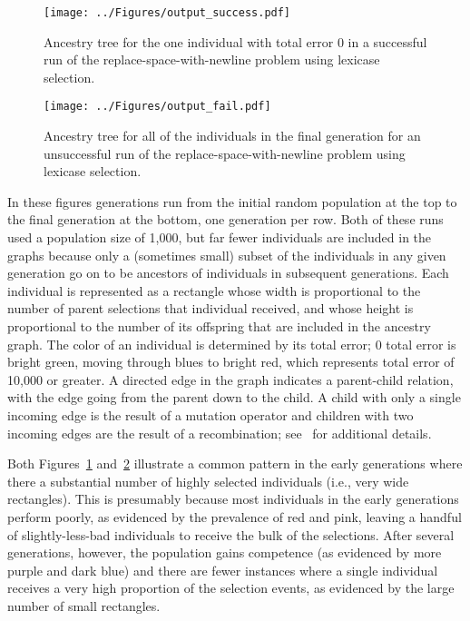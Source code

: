 \documentclass{sig-alternate}
\begin{document}
\begin{figure}[t]
	\centering
	\texttt{[image: ../Figures/output\_success.pdf]}
	\caption{Ancestry tree for the one individual with total error 0 in a successful run of the replace-space-with-newline problem using lexicase selection.}
	\label{fig:success}
\end{figure}

\begin{figure}[p]
	\centering
	\texttt{[image: ../Figures/output\_fail.pdf]}
	\caption{Ancestry tree for all of the individuals in the final generation for an unsuccessful run of the replace-space-with-newline problem using lexicase selection.}
	\label{fig:fail}
\end{figure}

In these figures generations run from the initial random population at the top to the final generation at the bottom, one generation per row.  Both of these runs used a population size of 1,000, but far fewer individuals are included in the graphs because only a (sometimes small) subset of the individuals in any given generation go on to be ancestors of individuals in subsequent generations. Each individual is represented as a rectangle whose width is proportional to the number of parent selections that individual received, and whose height is proportional to the number of its offspring that are included in the ancestry graph. 
The color of an individual is determined by its total error; 0 total error is bright green, moving through blues to bright red, which represents total error of 10,000 or greater. A directed edge in the graph indicates a parent-child relation, with the edge going from the parent down to the child. A child with only a single incoming edge is the result of a mutation operator and children with two incoming edges are the result of a recombination; see~\cite{Helmuth:2015:dissertation,Spector:2013:GPTP} for additional details.

Both Figures~\ref{fig:success} and~\ref{fig:fail} illustrate a common pattern in the early generations where there a substantial number of highly selected individuals (i.e., very wide rectangles). This is presumably because most individuals in the early generations perform poorly, as evidenced by the prevalence of red and pink, leaving a handful of slightly-less-bad individuals to receive the bulk of the selections. After several generations, however, the population gains competence (as evidenced by more purple and dark blue) and there are fewer instances where a single individual receives a very high proportion of the selection events, as evidenced by the large number of small rectangles.
\end{document}
